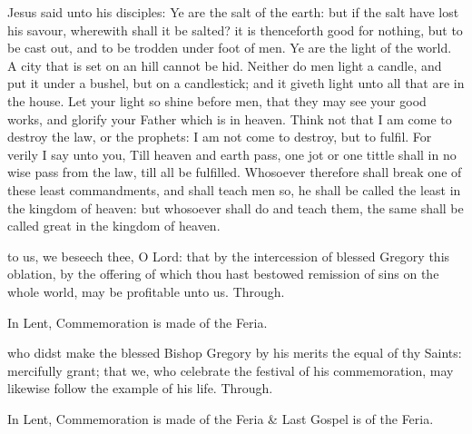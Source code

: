  Jesus said unto his disciples: Ye are the salt of the earth: but if the salt have lost his savour, wherewith shall it be salted? it is thenceforth good for nothing, but to be cast out, and to be trodden under foot of men. Ye are the light of the world. A city that is set on an hill cannot be hid. Neither do men light a candle, and put it under a bushel, but on a candlestick; and it giveth light unto all that are in the house. Let your light so shine before men, that they may see your good works, and glorify your Father which is in heaven. Think not that I am come to destroy the law, or the prophets: I am not come to destroy, but to fulfil. For verily I say unto you, Till heaven and earth pass, one jot or one tittle shall in no wise pass from the law, till all be fulfilled. Whosoever therefore shall break one of these least commandments, and shall teach men so, he shall be called the least in the kingdom of heaven: but whosoever shall do and teach them, the same shall be called great in the kingdom of heaven.

\vspace{-1ex}

\secret
{} to us, we beseech thee, O Lord: that by the intercession of blessed Gregory this oblation, by the offering of which thou hast bestowed remission of sins on the whole world, may be profitable unto us. Through.
\begin{rubric}
    In Lent, Commemoration is made of the Feria.%
\end{rubric}

\vspace{-0.5ex}


\vspace{-0.5ex}

\postcommunion
{} who didst make the blessed Bishop Gregory by his merits the equal of thy Saints: mercifully grant; that we, who celebrate the festival of his commemoration, may likewise follow the example of his life. Through.

\begin{rubric}
    In Lent, Commemoration is made of the Feria \& Last Gospel is of the Feria.
\end{rubric}


